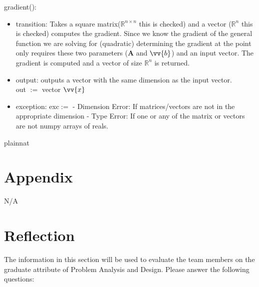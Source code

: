 \documentclass[12pt, titlepage]{article}
\begin{document}
gradient():
\begin{itemize}
\item transition: Takes a square matrix($\mathbb{R}^{n\times n}$ this is checked) and a vector ($\mathbb{R}^{n}$ this is checked) computes the gradient. Since we know the gradient of the general function we are solving for (quadratic) determining the gradient at the point only requires these two parameters ($\mathbf{A}$ and $\vv{b}$) and an input vector. The gradient is computed and a vector of size $\mathbb{R}^n$ is returned.
\item output: outputs a vector with the same dimension as the input vector.
\\
out $:=$ vector $\vv{x}$
\item exception: exc$:=$
\subitem -  Dimension Error: If matrices/vectors are not in the appropriate dimension
\subitem - Type Error: If one or any of the matrix or vectors are not numpy arrays of reals.
\end{itemize}



\fi 

\newpage

 {plainnat}


\newpage

\section{Appendix} \label{Appendix}

N/A
\section{Reflection}

The information in this section will be used to evaluate the team members on the
graduate attribute of Problem Analysis and Design.  Please answer the following questions:
\end{document}
